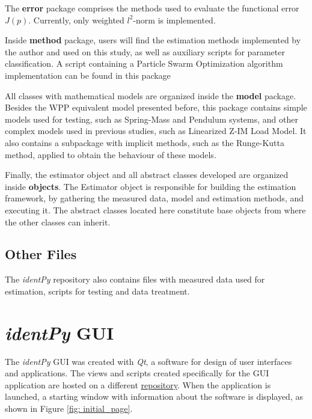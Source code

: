 The \textbf{error} package comprises the methods used to evaluate the functional error $J(p)$. Currently, only weighted $l^{2}$-norm is implemented.

Inside \textbf{method} package, users will find the estimation methods implemented by the author and used on this study, as well as auxiliary scripts for parameter classification. A script containing a Particle Swarm Optimization algorithm implementation can be found in this package

All classes with mathematical models are organized inside the \textbf{model} package. Besides the WPP equivalent model presented before, this package contains simple models used for testing, such as Spring-Mass and Pendulum systems, and other complex models used in previous studies, such as Linearized Z-IM Load Model. It also contains a subpackage with implicit methods, such as the Runge-Kutta method, applied to obtain the behaviour of these models.

Finally, the estimator object and all abstract classes developed are organized inside \textbf{objects}. The Estimator object is responsible for building the estimation framework, by gathering the measured data, model and estimation methods, and executing it. The abstract classes located here constitute base objects from where the other classes can inherit.

\subsection{Other Files}

The \textit{identPy} repository also contains files with measured data used for estimation, scripts for testing and data treatment.

\section{\textit{identPy} GUI}

The \textit{identPy} GUI was created with \textit{Qt}, a software for design of user interfaces and applications. The views and scripts created specifically for the GUI application are hosted on a different \href{https://github.com/gnegrelli/identPy_GUI}{repository}. When the application is launched, a starting window with information about the software is displayed, as shown in Figure \ref{fig: initial_page}.

